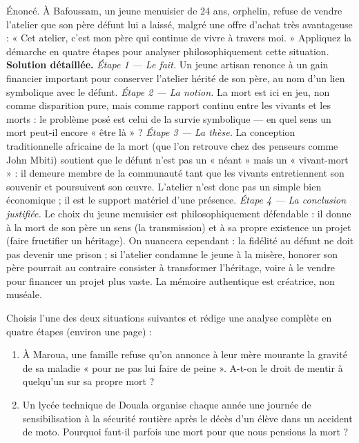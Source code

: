 \documentclass[11pt]{article}
\begin{document}
\begin{exoresolu}
Énoncé. À Bafoussam, un jeune menuisier de \num{24} ans, orphelin, refuse de vendre l'atelier que son père défunt lui a laissé, malgré une offre d'achat très avantageuse : « Cet atelier, c'est mon père qui continue de vivre à travers moi. » Appliquez la démarche en quatre étapes pour analyser philosophiquement cette situation.
\tcblower
\textbf{Solution détaillée.}
\emph{Étape 1 — Le fait.} Un jeune artisan renonce à un gain financier important pour conserver l'atelier hérité de son père, au nom d'un lien symbolique avec le défunt.
\emph{Étape 2 — La notion.} La mort est ici en jeu, non comme disparition pure, mais comme rapport continu entre les vivants et les morts : le problème posé est celui de la survie symbolique — en quel sens un mort peut-il encore « être là » ?
\emph{Étape 3 — La thèse.} La conception traditionnelle africaine de la mort (que l'on retrouve chez des penseurs comme John Mbiti) soutient que le défunt n'est pas un « néant » mais un « vivant-mort » : il demeure membre de la communauté tant que les vivants entretiennent son souvenir et poursuivent son œuvre. L'atelier n'est donc pas un simple bien économique ; il est le support matériel d'une présence.
\emph{Étape 4 — La conclusion justifiée.} Le choix du jeune menuisier est philosophiquement défendable : il donne à la mort de son père un sens (la transmission) et à sa propre existence un projet (faire fructifier un héritage). On nuancera cependant : la fidélité au défunt ne doit pas devenir une prison ; si l'atelier condamne le jeune à la misère, honorer son père pourrait au contraire consister à transformer l'héritage, voire à le vendre pour financer un projet plus vaste. La mémoire authentique est créatrice, non muséale.
\end{exoresolu}

\begin{exercice}
Choisis l'une des deux situations suivantes et rédige une analyse complète en quatre étapes (environ une page) :
\begin{enumerate}
\item À Maroua, une famille refuse qu'on annonce à leur mère mourante la gravité de sa maladie « pour ne pas lui faire de peine ». A-t-on le droit de mentir à quelqu'un sur sa propre mort ?
\item Un lycée technique de Douala organise chaque année une journée de sensibilisation à la sécurité routière après le décès d'un élève dans un accident de moto. Pourquoi faut-il parfois une mort pour que nous pensions la mort ?
\end{enumerate}
\end{exercice}
\end{document}
